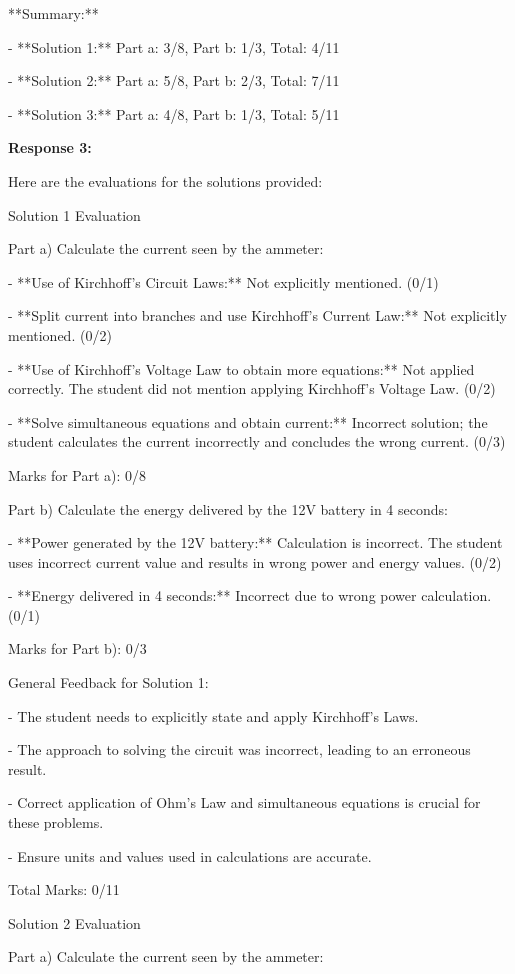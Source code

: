 \documentclass[a4paper,11pt]{article}
\begin{document}
**Summary:**

- **Solution 1:** Part a: 3/8, Part b: 1/3, Total: 4/11

- **Solution 2:** Part a: 5/8, Part b: 2/3, Total: 7/11

- **Solution 3:** Part a: 4/8, Part b: 1/3, Total: 5/11

\bigskip
\textbf{Response 3:}

Here are the evaluations for the solutions provided:

Solution 1 Evaluation

Part a) Calculate the current seen by the ammeter:

- **Use of Kirchhoff's Circuit Laws:** Not explicitly mentioned. (0/1)

- **Split current into branches and use Kirchhoff’s Current Law:** Not explicitly mentioned. (0/2)

- **Use of Kirchhoff’s Voltage Law to obtain more equations:** Not applied correctly. The student did not mention applying Kirchhoff’s Voltage Law. (0/2)

- **Solve simultaneous equations and obtain current:** Incorrect solution; the student calculates the current incorrectly and concludes the wrong current. (0/3)

Marks for Part a): 0/8

Part b) Calculate the energy delivered by the 12V battery in 4 seconds:

- **Power generated by the 12V battery:** Calculation is incorrect. The student uses incorrect current value and results in wrong power and energy values. (0/2)

- **Energy delivered in 4 seconds:** Incorrect due to wrong power calculation. (0/1)

Marks for Part b): 0/3

General Feedback for Solution 1:

- The student needs to explicitly state and apply Kirchhoff's Laws.

- The approach to solving the circuit was incorrect, leading to an erroneous result.

- Correct application of Ohm’s Law and simultaneous equations is crucial for these problems.

- Ensure units and values used in calculations are accurate.

Total Marks: 0/11

Solution 2 Evaluation

Part a) Calculate the current seen by the ammeter:
\end{document}
